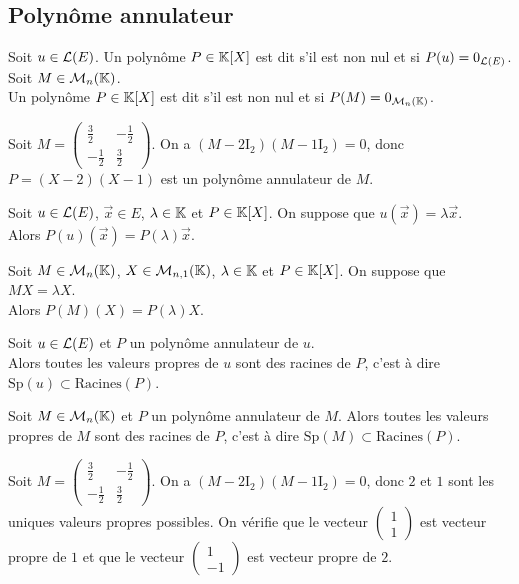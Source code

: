 \documentclass[a4paper]{book}
\begin{document}
\subsection{Polynôme annulateur}
\begin{Definition}
Soit $u\in \mathcal{L}(E)$.
Un polynôme $P\in \mathbb{K} [X]$ est dit  s'il est non nul et si $P(u) = 0_{\mathcal{L}(E)}$.\\
Soit $M\in \mathcal{M}_{n}(\mathbb{K})$.\\
Un polynôme $P\in \mathbb{K} [X]$ est dit  s'il est non nul et si $P(M) = 0_{\mathcal{M}_{n}(\mathbb{K})}$.
\end{Definition}
\begin{Exemple} Soit $M=\begin{pmatrix}\frac 3 2 &-\frac 1 2\\-\frac 1 2&\frac 3 2\end{pmatrix}$. On a $(M-2\mathrm{I}_2)(M-1\mathrm{I}_2)=0$, donc $P=(X-2)(X-1)$ est un polynôme annulateur de $M$.
\end{Exemple}
\begin{Lemme}
Soit $u\in \mathcal{L}(E)$, $\vec{x}\in E$, $\lambda    \in \mathbb{K} $ et $P\in \mathbb{K} [X]$.
On suppose que $u(\vec{x}) = \lambda    \vec{x}$.\\
Alors $P(u)(\vec{x}) = P(\lambda    ) \vec{x}$.
\end{Lemme}
\begin{Lemme}
Soit $M\in \mathcal{M}_{n}(\mathbb{K})$, $X\in \mathcal{M}_{n,1}(\mathbb{K})$, $\lambda    \in \mathbb{K} $ et $P\in \mathbb{K} [X]$.
On suppose que $MX = \lambda   X$.\\
Alors $P(M)(X) = P(\lambda    ) X$.
\end{Lemme}
\begin{Theoreme}
Soit $u\in \mathcal{L}(E)$ et $P$ un polynôme annulateur de $u$.\\
Alors toutes les valeurs propres de $u$ sont des racines de $P$, c'est à dire  $\mathrm{Sp}(u)\subset\mathrm{Racines}(P)$.
\end{Theoreme}
\begin{Theoreme}
Soit $M\in \mathcal{M}_{n}(\mathbb{K})$ et $P$ un polynôme annulateur de $M$.
Alors toutes les valeurs propres de $M$ sont des racines de $P$, c'est à dire  $\mathrm{Sp}(M)\subset\mathrm{Racines}(P)$.
\end{Theoreme}
\begin{Exemple} Soit $M=\begin{pmatrix}\frac 3 2 &-\frac 1 2\\-\frac 1 2&\frac 3 2\end{pmatrix}$. On a $(M-2\mathrm{I}_2)(M-1\mathrm{I}_2)=0$, donc $2$ et $1$ sont les uniques valeurs propres possibles. On vérifie que le vecteur $\begin{pmatrix}1\\1\end{pmatrix}$ est vecteur propre de $1$ et que le vecteur  $\begin{pmatrix}1\\-1\end{pmatrix}$ est vecteur propre de $2$.
\end{Exemple}
\end{document}
